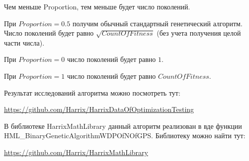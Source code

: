 Чем меньше Proportion, тем меньше будет число поколений.

При $ Proportion=0.5 $ получим обычный стандартный генетический алгоритм. Число поколений будет равно $ \sqrt{CountOfFitness}$ (без учета получения целой части числа).

При $ Proportion=0 $ число поколений будет равно $ 1 $.

При $ Proportion=1 $ число поколений будет равно $ CountOfFitness $.

Результат исследований алгоритма можно посмотреть тут:

\href{https://github.com/Harrix/HarrixDataOfOptimizationTesting}{https://github.com/Harrix/HarrixDataOfOptimizationTesting}

В библиотеке HarrixMathLibrary данный алгоритм реализован в вде функции HML\_BinaryGeneticAlgorithmWDPOfNOfGPS. Библиотеку можно найти тут:

\href{https://github.com/Harrix/HarrixMathLibrary}{https://github.com/Harrix/HarrixMathLibrary}